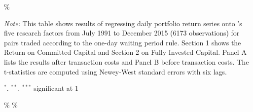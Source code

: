 \documentclass[a4paper]{article}
\begin{document}
\begin{sidewaystable}
\begin{threeparttable}[H]
\begin{tabularx}{\textwidth}{@{\extracolsep{\fill}}lllllllllllllll@{}}
			\bottomrule
		\end{tabularx}\%
		\begin{tablenotes}
			\item \textit{Note:} \scriptsize  This table shows results of regressing daily portfolio return series onto \citet*{ff15}'s five research factors from July 1991 to December 2015 (6173 observations) for pairs traded according to the one-day waiting period rule. Section 1 shows the Return on Committed Capital and Section 2 on Fully Invested Capital. Panel A lists the results after transaction costs and Panel B before transaction costs. The t-statistics are computed using Newey-West standard errors with six lags.
			\item \scriptsize $^{\ast}$. $^{\ast\ast}$. $^{\ast\ast\ast}$  significant at 1\\%
		\end{tablenotes}
	\end{threeparttable}\%
	\label{tab:table117}\%
\end{sidewaystable}

\vspace{0.3cm}
\end{document}
